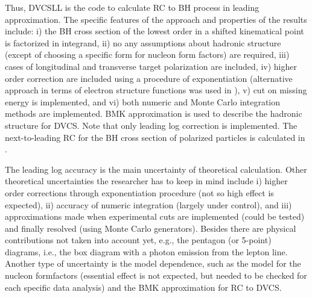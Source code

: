 \documentclass[aps,prd,reprint,groupedaddress,preprintnumbers,showpacs]{revtex4-1}
\begin{document}
Thus, DVCSLL is the code to calculate RC to BH process in leading approximation. The specific features of the approach and properties of the results include: i) the BH cross section of the lowest order in a shifted kinematical point is factorized in integrand, ii) no any assumptions about hadronic structure (except of choosing a specific form for nucleon form factors) are required, iii) cases of longitudinal and transverse target polarization are included, iv) higher order correction are included using a procedure of exponentiation (alternative approach in terms of electron structure functions was used in \cite{ByKuTo2008PRC, AkushevichIlyichev2012}), v) cut on 
missing energy
is implemented, and vi) both numeric and Monte Carlo integration methods are implemented. BMK approximation is used to describe
the hadronic structure for DVCS. Note that only leading log correction is implemented. 
The next-to-leading RC for the BH cross section of polarized particles is calculated in \cite{AISh2014}.

The leading log accuracy is the main uncertainty of theoretical calculation. Other theoretical uncertainties the researcher has to keep in mind include i) higher order corrections through exponentiation procedure (not so high effect is expected), ii) accuracy of numeric integration (largely under control), and iii)  approximations made when experimental cuts are implemented (could be tested) and finally resolved (using Monte Carlo generators). Besides there are physical contributions not taken into account yet, e.g.,  the pentagon (or 5-point) diagrams, i.e., the box diagram with a photon emission from the lepton line. Another type of uncertainty is the model dependence, such as the model for the nucleon formfactors (essential effect is not expected, but needed to be checked for each specific data analysis) and the BMK approximation for RC to DVCS. 
\end{document}
